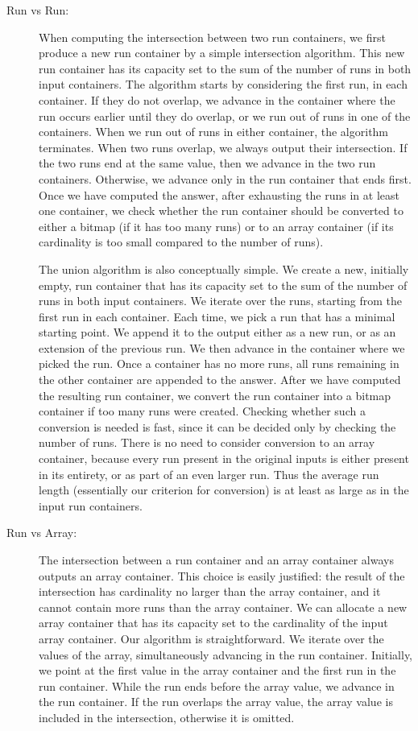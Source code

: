 \documentclass[times]{speauth}
\begin{document}
\begin{description}
\item [Run vs Run:] When computing the intersection between
two run containers, we first produce a new run container by a simple intersection algorithm. This new run container has its capacity
set to the sum of the number of runs in both input containers.
 The algorithm starts by considering
the first run, in each container. If they do not overlap, we advance in
the container where the run occurs earlier until they do overlap, or we run out of runs in one of the containers. When we run out of runs in either container, the algorithm terminates. When two runs overlap, we always output their intersection. If the  two runs end at the same value, then we advance in the two run containers. Otherwise, we advance only in the run container that ends first. Once we have computed the answer, after exhausting the runs in at least one container, we check whether the run container should be converted to either a bitmap (if it has too many runs) or to an array container (if its cardinality is too small compared to the number of runs).

The union algorithm is also conceptually simple. We create a new, initially empty, run container that has its capacity set to the sum of the number of runs in both input containers. We iterate over the runs, starting from the first run  in each container. Each time, we pick a run that
has a minimal starting point. We append it to the output
either as a new run, or as an extension of the previous run.
We then advance in the container where we picked the run. Once a container has no more runs, all runs remaining in the other container are appended to the answer. After we have computed the resulting run container,  we convert the run container into a bitmap container if too many runs were created. Checking whether such a conversion is needed is fast, since it can be decided only by checking the number of runs.
There is no need to consider conversion to an array container, because every run present in the original inputs is either present in its
entirety, or as part of an even larger run.  Thus the average run length (essentially our criterion for conversion) is at least as
large as in the input run containers.


\item [Run vs Array:] The intersection between a run container and an array container always outputs an array container. This choice is easily justified: the result of the intersection
has cardinality no larger than the array container, and it cannot contain more runs than
the array container.
We can allocate a new array container that has its capacity set to the
cardinality of the input array container.
Our algorithm is straightforward. We iterate over the values of the array, simultaneously advancing in the run container. Initially, we point at the first value in the array container and the first run in the run container. While the run ends before the array value, we advance in the run container. If the run overlaps the array value, the array value is included in the intersection, otherwise it is omitted.


\end{description}
\end{document}
